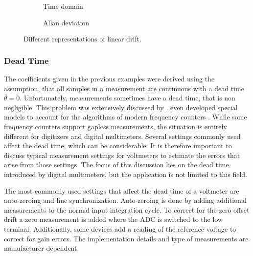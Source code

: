 \begin{figure}[ht]
    \centering
    \begin{subfigure}{0.32\linewidth}
        \centering
        \scalebox{0.75}{%
            
        } %
        \caption{Time domain}
        \label{fig:drift_time}
    \end{subfigure}
    \begin{subfigure}{0.32\linewidth}
        \centering
        \scalebox{0.75}{%
            
        } %
        \caption{Allan deviation}
        \label{fig:drift_adev}
    \end{subfigure}
    \caption{Different representations of linear drift.}
    \label{fig:drift_noise_simulated}
\end{figure}

\subsubsection{Dead Time}%
\label{sec:dead_time}
The coefficients given in the previous examples were derived using the assumption, that all samples in a measurement are continuous with a dead time $\theta = 0$. Unfortunately, measurements sometimes have a dead time, that is non negligible. This problem was extensively discussed by \citeauthor{psd_to_adev} \cite{psd_to_adev}. \citeauthor{adev_frequency_counter} even developed special models to account for the algorithms of modern frequency counters \cite{adev_frequency_counter}. While some frequency counters support gapless measurements, the situation is entirely different for digitizers and digital multimeters. Several settings commonly used affect the dead time, which can be considerable. It is therefore important to discuss typical measurement settings for voltmeters to estimate the errors that arise from those settings. The focus of this discussion lies on the dead time introduced by digital multimeters, but the application is not limited to this field.

The most commonly used settings that affect the dead time of a voltmeter are auto-zeroing and line synchronization. Auto-zeroing is done by adding additional measurements to the normal input integration cycle. To correct for the zero offset drift a zero measurement is added where the ADC is switched to the low terminal. Additionally, some devices add a reading of the reference voltage to correct for gain errors. The implementation details and type of measurements are manufacturer dependent.

